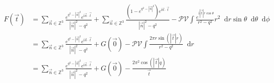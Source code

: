 \documentclass[UTF8]{ctexart}
\newcommand*{\dif}{\mathop{}\!\mathrm{d}}
\begin{document}
\begin{equation}\label{4-c-1}
    \begin{aligned}
        F(\vec{t})&=\sum_{\vec{n}\in\mathbb{Z}^3}\frac{e^{q^2-|\vec{n}|^2}e^{\mathrm{i}\vec{n}\cdot\vec{t}}}{|\vec{n}|^2-q^2}+\sum_{\vec{n}\in\mathbb{Z}^3}\frac{(1-e^{q^2-|\vec{n}|^2})e^{\mathrm{i}\vec{n}\cdot\vec{t}}}{|\vec{n}|^2-q^2}-\mathcal{PV}\int\frac{e^{\mathrm{i}|\vec{t}|r\cos\theta}}{r^2-q^2}r^2\dif r\sin\theta\dif\theta\dif\phi\\
        &=\sum_{\vec{n}\in\mathbb{Z}^3}\frac{e^{q^2-|\vec{n}|^2}e^{\mathrm{i}\vec{n}\cdot\vec{t}}}{|\vec{n}|^2-q^2}+G(\vec{0})-\mathcal{PV}\int\frac{2\pi r\sin(|\vec{t}|r)}{r^2-q^2}\dif r\\
        &=\sum_{\vec{n}\in\mathbb{Z}^3}\frac{e^{q^2-|\vec{n}|^2}e^{\mathrm{i}\vec{n}\cdot\vec{t}}}{|\vec{n}|^2-q^2}+G(\vec{0})-\frac{2\pi^2\cos(|\vec{t}|q)}{\vec{t}}
    \end{aligned}
\end{equation}
\end{document}
